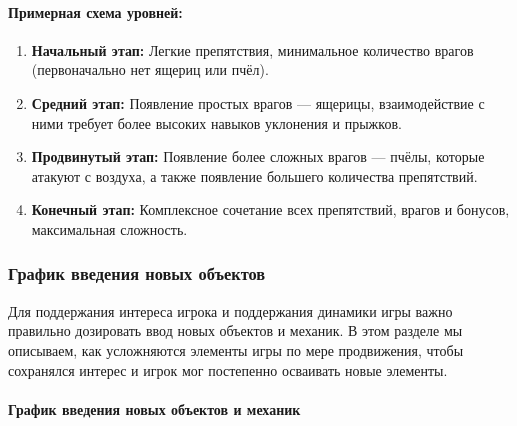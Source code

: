 \documentclass{article}
\begin{document}
\paragraph{Примерная схема уровней:}
\begin{enumerate}[label=\arabic*.]
    \item \textbf{Начальный этап:} Легкие препятствия, минимальное количество врагов (первоначально нет ящериц или пчёл).
    \item \textbf{Средний этап:} Появление простых врагов — ящерицы, взаимодействие с ними требует более высоких навыков уклонения и прыжков.
    \item \textbf{Продвинутый этап:} Появление более сложных врагов — пчёлы, которые атакуют с воздуха, а также появление большего количества препятствий.
    \item \textbf{Конечный этап:} Комплексное сочетание всех препятствий, врагов и бонусов, максимальная сложность.
\end{enumerate}

\subsubsection{График введения новых объектов}
Для поддержания интереса игрока и поддержания динамики игры важно правильно дозировать ввод новых объектов и механик. В этом разделе мы описываем, как усложняются элементы игры по мере продвижения, чтобы сохранялся интерес и игрок мог постепенно осваивать новые элементы.

\paragraph{График введения новых объектов и механик}
\end{document}
